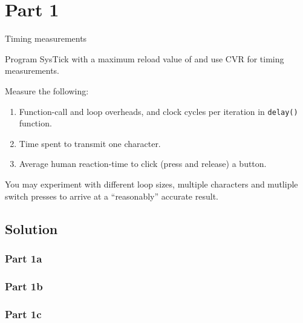 \section*{Part 1}

Timing measurements

Program SysTick with a maximum reload value of  and use CVR for timing measurements.

Measure the following:
\begin{enumerate}[label= (\alph*), noitemsep, topsep=0pt]
    \item Function-call and loop overheads, and clock cycles per iteration in \texttt{delay\@()} function.
    \item Time spent to transmit one character.
    \item Average human reaction-time to click (press and release) a button.
\end{enumerate}

You may experiment with different loop sizes, multiple characters and mutliple switch presses to arrive at a ``reasonably'' accurate result.

\subsection*{Solution}

\subsubsection*{Part 1a}

\subsubsection*{Part 1b}

\subsubsection*{Part 1c}
